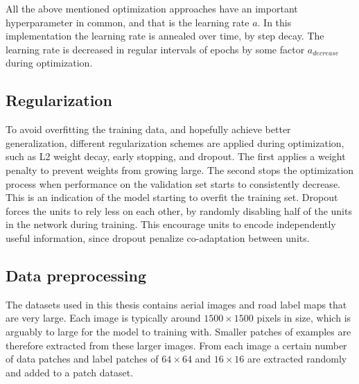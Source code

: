 All the above mentioned optimization approaches have an important hyperparameter in common, and that is the learning rate $a$. In this implementation the learning rate is annealed over time, by step decay. The learning rate is decreased in regular intervals of epochs by some factor $a_{decrease}$ during optimization. \\


\subsection{Regularization}



To avoid overfitting the training data, and hopefully achieve better generalization, different regularization schemes are applied during optimization, such as L2 weight decay, early stopping, and dropout. The first applies a weight penalty to prevent weights from growing large. The second stops the optimization process when performance on the validation set starts to consistently decrease. This is an indication of the model starting to overfit the training set. Dropout forces the units to rely less on each other, by randomly disabling half of the units in the network during training. This encourage units to encode independently useful information, since dropout penalize co-adaptation between units.\\


\subsection{Data preprocessing}
The datasets used in this thesis contains aerial images and road label maps that are very large. Each image is typically around $1500 \times 1500$ pixels in size, which is arguably to large for the model to training with. Smaller patches of examples are therefore extracted from these larger images. From each image a certain number of data patches and label patches of $64 \times 64$ and $16 \times 16$ are extracted randomly and added to a patch dataset.\\

